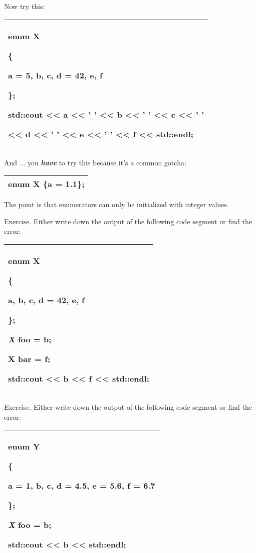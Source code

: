\documentclass[
]{article}
\begin{document}
Now try this:

\begin{longtable}[]{@{}l@{}}
\toprule
\endhead
\begin{minipage}[t]{0.97\columnwidth}\raggedright
enum X

\{

a = 5, b, c, d = 42, e, f

\};

std::cout \textless\textless{} a \textless\textless{} ' '
\textless\textless{} b \textless\textless{} ' ' \textless\textless{} c
\textless\textless{} ' '

\textless\textless{} d \textless\textless{} ' ' \textless\textless{} e
\textless\textless{} ' ' \textless\textless{} f \textless\textless{}
std::endl;\strut
\end{minipage}\tabularnewline
\bottomrule
\end{longtable}

And ... you \emph{\textbf{have}} to try this because it's a common
gotcha:

\begin{longtable}[]{@{}l@{}}
\toprule
\endhead
enum X \{a = 1.1\};\tabularnewline
\bottomrule
\end{longtable}

The point is that enumerators can only be initialized with integer
values.

Exercise. Either write down the output of the following code segment or
find the error:

\begin{longtable}[]{@{}l@{}}
\toprule
\endhead
\begin{minipage}[t]{0.97\columnwidth}\raggedright
enum X

\{

a, b, c, d = 42, e, f

\};

\emph{X} foo = b;

X bar = f;

std::cout \textless\textless{} b \textless\textless{} f
\textless\textless{} std::endl;\strut
\end{minipage}\tabularnewline
\bottomrule
\end{longtable}

Exercise. Either write down the output of the following code segment or
find the error:

\begin{longtable}[]{@{}l@{}}
\toprule
\endhead
\begin{minipage}[t]{0.97\columnwidth}\raggedright
enum Y

\{

a = 1, b, c, d = 4.5, e = 5.6, f = 6.7

\};

\emph{X} foo = b;

std::cout \textless\textless{} b \textless\textless{} std::endl;\strut
\end{minipage}\tabularnewline
\bottomrule
\end{longtable}
\end{document}
